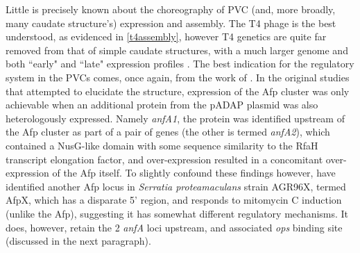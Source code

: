 Little is precisely known about the choreography of PVC (and, more broadly, many caudate structure's) expression and assembly. The T4 phage is the best understood, as evidenced in \vref{t4assembly}, however T4 genetics are quite far removed from that of simple caudate structures, with a much larger genome and both ``early" and ``late" expression profiles \citep{OFarrell1973}. The best indication for the regulatory system in the PVCs comes, once again, from the work of \cite{Hurst2007a, Hurst2004}. In the original studies that attempted to elucidate the structure, expression of the Afp cluster was only achievable when an additional protein from the pADAP plasmid was also heterologously expressed. Namely \emph{anfA1}, the protein was identified upstream of the Afp cluster as part of a pair of genes (the other is termed \emph{anfA2}), which contained a NusG-like domain with some sequence similarity to the RfaH transcript elongation factor, and over-expression resulted in a concomitant over-expression of the Afp itself. To slightly confound these findings however, \cite{Hurst2018} have identified another Afp locus in \emph{Serratia proteamaculans} strain AGR96X, termed AfpX, which has a disparate 5' region, and responds to mitomycin C induction (unlike the Afp), suggesting it has somewhat different regulatory mechanisms. It does, however, retain the 2 \emph{anfA} loci upstream, and associated \emph{ops} binding site (discussed in the next paragraph).

